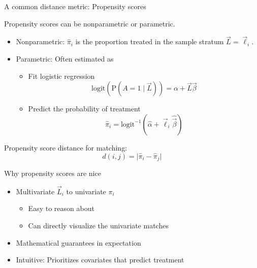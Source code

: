 \documentclass{beamer}
\renewcommand\P{\text{P}}
\begin{document}
\begin{frame}{A common distance metric: Propensity scores}

Propensity scores can be nonparametric or parametric.
\begin{itemize} \pause
\item Nonparametric: $\hat\pi_i$ is the proportion treated in the sample stratum $\vec{L} = \vec\ell_i$. \pause
\item Parametric: Often estimated as
\begin{itemize}
\item Fit logistic regression
$$\text{logit}\left(\P(A = 1\mid \vec{L})\right) = \alpha + \vec{L}\vec\beta$$ \pause
\item Predict the probability of treatment
$$\hat\pi_i = \text{logit}^{-1}\left(\hat\alpha + \vec\ell_i\hat{\vec\beta}\right)$$ \vspace{-.2in}
\end{itemize}
\end{itemize} \pause
Propensity score distance for matching:
$$d(i,j) = \lvert \hat\pi_i - \hat\pi_j\rvert $$

\end{frame}

\begin{frame}{Why propensity scores are nice} \pause

\begin{itemize}
\item Multivariate $\vec{L}_i$ to univariate $\pi_i$ \pause
\begin{itemize}
\item Easy to reason about \pause
\item Can directly visualize the univariate matches
\end{itemize} \pause
\item Mathematical guarantees in expectation \pause
\item Intuitive: Prioritizes covariates that predict treatment
\end{itemize}

\end{frame}
\end{document}
